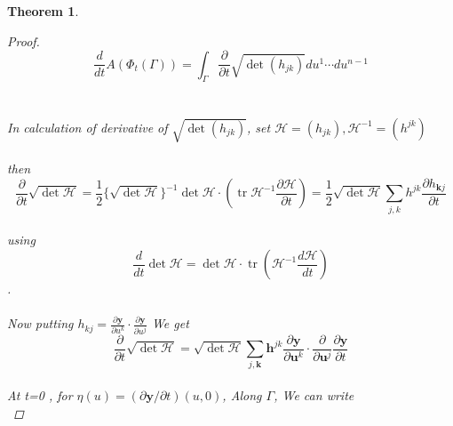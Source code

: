 \documentclass[oneside]{book}
\newtheorem{theorem}{Theorem}[section]
\begin{document}
\begin{theorem}
\begin{proof}
			$$
			\frac{d}{d t} A\left(\Phi_{t}(\Gamma)\right)=\int_{\Gamma} \frac{\partial}{\partial t} \sqrt{\operatorname{det}\left(h_{j k}\right)} d u^{1} \cdots d u^{n-1}$$ \\\\
			In calculation of  derivative of $\sqrt{\operatorname{det}\left(h_{j k}\right)}$, set $\mathcal{H}=\left(h_{j k}\right), \mathcal{H}^{-1}=\left(h^{j k}\right) $ \\\\ then \\
			$$
			\frac{\partial}{\partial t} \sqrt{\operatorname{det} \mathcal{H}}=\frac{1}{2}\{\sqrt{\operatorname{det} \mathcal{H}}\}^{-1} \operatorname{det} \mathcal{H} \cdot\left(\operatorname{tr} \mathcal{H}^{-1} \frac{\partial \mathcal{H}}{\partial t}\right)=\frac{1}{2} \sqrt{\operatorname{det} \mathcal{H}} \sum_{j, k}{h}^{j k} \frac{\partial h_{\boldsymbol{k} j}}{\partial t}$$  \\
			using 
			$$\frac{d}{d t} \operatorname{det} \mathcal{H}=\operatorname{det} \mathcal{H} \cdot \operatorname{tr}\left(\mathcal{H}^{-1} \frac{d \mathcal{H}}{d t}\right) $$.  
			\\\\
			Now putting  $h_{k j}=\frac{\partial \mathbf{y}}{\partial u^{k}} \cdot \frac{\partial \mathbf{y}}{\partial u^{j}}$ 
			We get \\
			
			
			$$\frac{\partial}{\partial t} \sqrt{\operatorname{det} \mathcal{H}}=\sqrt{\operatorname{det} \mathcal{H}} \sum_{j, \boldsymbol{k}} \boldsymbol{h}^{j k} \frac{\partial \mathbf{y}}{\partial \boldsymbol{u}^{k}} \cdot \frac{\partial}{\partial \boldsymbol{u}^{j}} \frac{\partial \mathbf{y}}{\partial t}$$  \\
			
			At t=0 ,  for  $\eta(u)=(\partial \mathbf{y} / \partial t)(u, 0)$, Along $\Gamma$, We can write \\
			

\end{proof}
\end{theorem}
\end{document}
